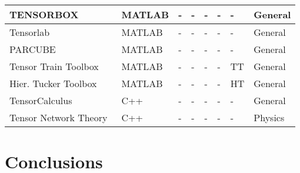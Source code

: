 \documentclass[10pt]{article}
\makeatletter
\newcommand{\ccell}[3][]{%
  \kern-\fboxsep
  \if\relax\detokenize{#1}\relax
    \expandafter\@firstoftwo
  \else
    \expandafter\@secondoftwo
  \fi
  {\colorbox{#2}}%
  {\colorbox[#1]{#2}}%
  {#3}\kern-\fboxsep
}
\newcommand{\yesy}{\ccell{green}{Y}}
\newcommand{\non}{\ccell{red}{N}}
\makeatother
\begin{document}
\begin{center}
\begin{tabular}{ | l | l | l | l | l | l | l | l |}
    TENSORBOX~\cite{TENSORBOX}
    & MATLAB & \yesy & \yesy & \yesy & \yesy & \non & General \\ \hline
    Tensorlab~\cite{Tensorlab}
    & MATLAB & \yesy & \yesy & \yesy & \non & \non & General \\ \hline
    PARCUBE~\cite{PARCUBE}
    & MATLAB & \yesy & \yesy & \yesy & \non & \non & General \\ \hline
    Tensor Train Toolbox~\cite{tt-toolbox}
    & MATLAB & \yesy & \yesy & \yesy & \non & TT & General \\ \hline
    Hier. Tucker Toolbox~\cite{HT,Kressner:2014:A9H:2610268.2538688} 		& MATLAB & \yesy & \yesy & \yesy & \non & HT & General \\ \hline
    TensorCalculus~\cite{Calculus}
    & C++ & \yesy & \yesy & \yesy & \yesy & \yesy & General \\ \hline
    Tensor Network Theory~\cite{TNT}
    & C++ & \yesy & \yesy & \yesy & \yesy & \yesy & Physics \\
    \hline
    \end{tabular}
\end{center}
\section{Conclusions} \label{sec:conclusions}



 



\end{document}
